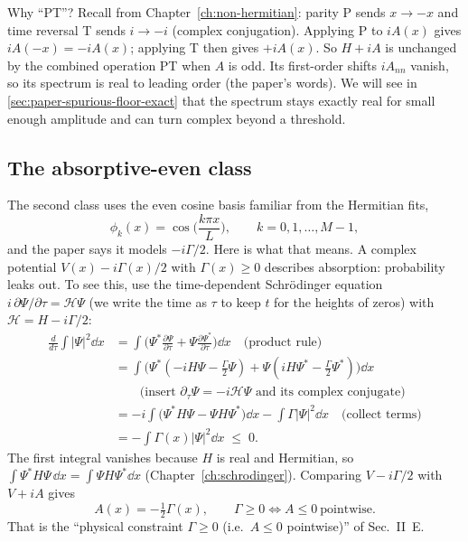 Why ``PT''? Recall from Chapter~\ref{ch:non-hermitian}: parity P sends $x\to-x$ and time reversal T sends $i\to-i$ (complex conjugation). Applying P to $iA(x)$ gives $iA(-x)=-iA(x)$; applying T then gives $+iA(x)$. So $H+iA$ is unchanged by the combined operation PT when $A$ is odd. Its first-order shifts $iA_{nn}$ vanish, so its spectrum is real to leading order (the paper's words). We will see in \cref{sec:paper-spurious-floor-exact} that the spectrum stays exactly real for small enough amplitude and can turn complex beyond a threshold.

\subsection{The absorptive-even class}

The second class uses the even cosine basis familiar from the Hermitian fits,
\begin{equation}
\phi_k(x)=\cos\!\Big(\frac{k\pi x}{L}\Big),\qquad k=0,1,\dots,M-1,\label{eq:paper-spurious-floor-even}
\end{equation}
and the paper says it models $-i\Gamma/2$. Here is what that means. A complex potential $V(x)-i\Gamma(x)/2$ with $\Gamma(x)\ge0$ describes absorption: probability leaks out. To see this, use the time-dependent Schr\"odinger equation $i\,\partial\Psi/\partial\tau=\mathcal H\Psi$ (we write the time as $\tau$ to keep $t$ for the heights of zeros) with $\mathcal H=H-i\Gamma/2$:
\begin{align}
\frac{d}{d\tau}\int|\Psi|^2\dd x
&=\int\Big(\Psi^*\frac{\partial\Psi}{\partial\tau}+\Psi\frac{\partial\Psi^*}{\partial\tau}\Big)\dd x
\quad\text{(product rule)}\nonumber\\
&=\int\Big(\Psi^*(-iH\Psi-\tfrac{\Gamma}{2}\Psi)+\Psi(iH\Psi^*-\tfrac{\Gamma}{2}\Psi^*)\Big)\dd x
\nonumber\\
&\qquad\text{(insert }\partial_\tau\Psi=-i\mathcal H\Psi\text{ and its complex conjugate)}\nonumber\\
&=-i\int\big(\Psi^*H\Psi-\Psi H\Psi^*\big)\dd x-\int\Gamma|\Psi|^2\dd x
\quad\text{(collect terms)}\nonumber\\
&=-\int\Gamma(x)|\Psi|^2\dd x\;\le\;0.\label{eq:paper-spurious-floor-decay}
\end{align}
The first integral vanishes because $H$ is real and Hermitian, so $\int\Psi^*H\Psi\,\dd x=\int\Psi H\Psi^*\dd x$ (Chapter~\ref{ch:schrodinger}). Comparing $V-i\Gamma/2$ with $V+iA$ gives
\begin{equation}
A(x)=-\tfrac12\Gamma(x),\qquad\Gamma\ge0\iff A\le0\ \text{pointwise}.\label{eq:paper-spurious-floor-GammaA}
\end{equation}
That is the ``physical constraint $\Gamma\ge0$ (i.e.\ $A\le0$ pointwise)'' of Sec.~II~E.

